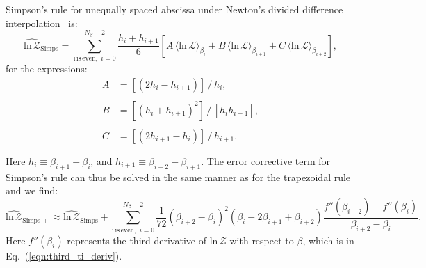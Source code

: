 Simpson's rule for unequally spaced abscissa under Newton's divided difference interpolation~\citep{easa1988area} is:
\begin{equation}
    \widehat{\mathrm{ln} \, \mathcal{Z}}_{\mathrm{Simps}} = \sum_{\mathrm{i\, is\, even}, \, \, i=0}^{N_\beta-2} \frac{h_i + h_{i+1}}{6} \left [ A \, \langle \mathrm{ln} \, \mathcal{L} \rangle_{\beta_{i}} + B \, \langle \mathrm{ln} \, \mathcal{L} \rangle_{\beta_{i+1}} + C \, \langle \mathrm{ln} \, \mathcal{L} \rangle_{\beta_{i+2}}\right ],
\end{equation}
for the expressions:
\begin{equation}
\begin{array}{lll}
     A &= \left [(2h_i - h_{i+1})\right] \, / \, h_i, \\ \\ 
     B &= \left [(h_i+h_{i+1})^2 \right] \, / \, \left[h_i h_{i+1}\right], \\ \\
     C &= \left [(2h_{i+1} - h_i)\right] \, / \, h_{i+1}. \\ \\
\end{array}
\end{equation}
Here  $h_i \equiv \beta_{i+1} - \beta_i$, and $h_{i+1} \equiv \beta_{i+2} - \beta_{i+1}$. The error corrective term for Simpson's rule can thus be solved in the same manner as for the trapezoidal rule and we find:
\begin{equation}
    \widehat{\mathrm{ln} \, \mathcal{Z}}_{\mathrm{Simps \, +}} \approx \widehat{\mathrm{ln} \, \mathcal{Z}}_{\mathrm{Simps}} + \sum_{\mathrm{i\, is\, even}, \, \, i=0}^{N_\beta-2} \frac{1}{72}\left(\beta_{i+2} - \beta_{i} \right)^2 (\beta_i - 2\beta_{i+1} + \beta_{i+2})\frac{f''(\beta_{i+2}) - f''(\beta_i)}{\beta_{i+2} - \beta_i}.
\end{equation}
Here $f''(\beta_i)$ represents the third derivative of $\mathrm{ln} \, \mathcal{Z}$ with respect to $\beta$, which is in Eq.~(\ref{eqn:third_ti_deriv}).

